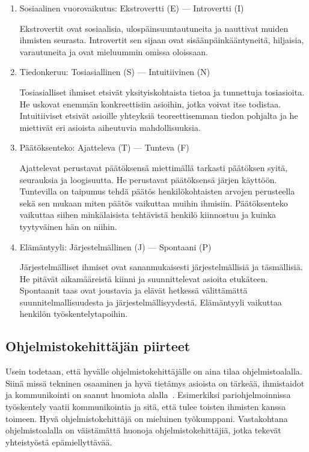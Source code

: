 \documentclass[finnish]{../tktltiki2}
\theoremstyle{definition}
\theoremstyle{remark}
\begin{document}
\begin{enumerate}

\item Sosiaalinen vuorovaikutus: Ekstrovertti (E) --- Introvertti (I)

Ekstrovertit ovat sosiaalisia, ulospäinsuuntautuneita ja nauttivat
muiden ihmisten seurasta. Introvertit sen sijaan ovat sisäänpäinkääntyneitä, hiljaisia, varautuneita ja ovat mieluummin omissa oloissaan.

\item Tiedonkeruu: Tosiasiallinen (S) --- Intuitiivinen (N)

Tosiasialliset ihmiset etsivät yksityiskohtaista tietoa ja tunnettuja
tosiasioita. He uskovat enemmän konkreettisiin asioihin, jotka
voivat itse todistaa. Intuitiiviset etsivät asioille
yhteyksiä teoreettisemman tiedon pohjalta ja
he miettivät eri asioista aiheutuvia mahdollisuuksia.

\item Päätöksenteko: Ajatteleva (T) --- Tunteva (F)

Ajattelevat perustavat päätöksensä miettimällä tarkasti päätöksen syitä, seurauksia ja loogisuutta. He perustavat päätöksensä järjen käyttöön. Tuntevilla on taipumus tehdä päätös
henkilökohtaisten arvojen perusteella sekä sen mukaan miten päätös
vaikuttaa muihin ihmisiin. Päätöksenteko vaikuttaa siihen minkälaisista tehtävistä
henkilö kiinnostuu ja kuinka tyytyväinen hän on niihin.

\item Elämäntyyli: Järjestelmällinen (J) --- Spontaani (P)

Järjestelmälliset ihmiset ovat sananmukaisesti järjestelmällisiä
ja täsmäl\-lisiä. He pitävät aikamääreistä kiinni ja suunnittelevat
asioita etukäteen. Spontaanit taas ovat joustavia ja elävät
hetkessä välittämättä suunnitelmallisuudesta ja järjestelmällisyydestä.
Elämäntyyli vaikuttaa henkilön työskentelytapoihin.

\end{enumerate}

\subsection{Ohjelmistokehittäjän piirteet}

Usein todetaan, että hyvälle ohjelmistokehittäjälle on aina tilaa ohjelmistoalalla.
Siinä missä tekninen osaaminen ja hyvä tietämys asioista on
tärkeää, ihmistaidot ja kommunikointi on saanut
huomiota alalla~\cite{Hall:2007:CNT:1235000.1235043}. Esimerkiksi
pariohjelmoinnissa työskentely vaatii kommunikointia ja sitä, että
tulee toisten ihmisten kanssa toimeen. Hyvä ohjelmistokehittäjä
on mieluinen työkumppani. Vastakohtana ohjelmistoalalla
on väistämättä huonoja ohjelmistokehittäjiä, jotka tekevät
yhteistyöstä epämiellyttävää.\\
\end{document}
